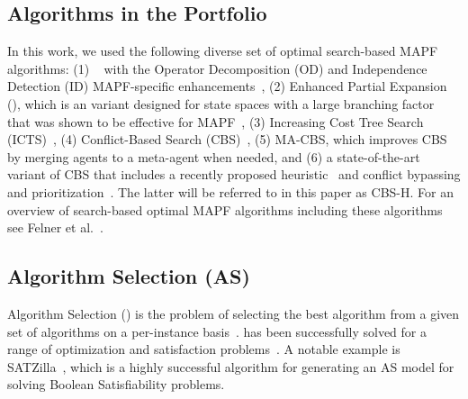 \documentclass[letterpaper]{article} %
\begin{document}


\subsection{Algorithms in the Portfolio}
In this work, we used the following diverse set of optimal search-based MAPF algorithms: 
(1) \astar~\cite{hart1968formal} with the Operator Decomposition (OD) and Independence Detection (ID) MAPF-specific enhancements~\cite{standley2010finding}, 
(2) Enhanced Partial Expansion \astar (\epea), which is an \astar variant designed for state spaces with a large branching factor that was shown to be effective for MAPF~\cite{goldenberg2014enhanced}, 
(3) Increasing Cost Tree Search (ICTS)~\cite{sharon2013increasing}, 
(4) Conflict-Based Search (CBS)~\cite{sharon2015conflict}, (5) MA-CBS, which improves CBS by merging agents to a meta-agent when needed, 
and (6) a state-of-the-art variant of CBS that includes a recently proposed heuristic~\cite{li2019improved} and conflict bypassing and prioritization~\cite{boyarski2015icbs}. 
The latter will be referred to in this paper as CBS-H. 
For an overview of search-based optimal MAPF algorithms including these algorithms see Felner et al.~\cite{felner2017search}. 



\subsection{Algorithm Selection (AS)}

Algorithm Selection (\AS) is the problem of selecting the best algorithm from a given set of algorithms on a per-instance basis~\cite{rice1976algorithm}. 
\AS has been successfully solved for a range of optimization and satisfaction problems~\cite{kotthoff2016algorithm,kerschke2019automated}. A notable example is SATZilla~\cite{xu2012satzilla2012}, which is a highly successful algorithm for generating an AS model for solving Boolean Satisfiability problems. 
\end{document}
